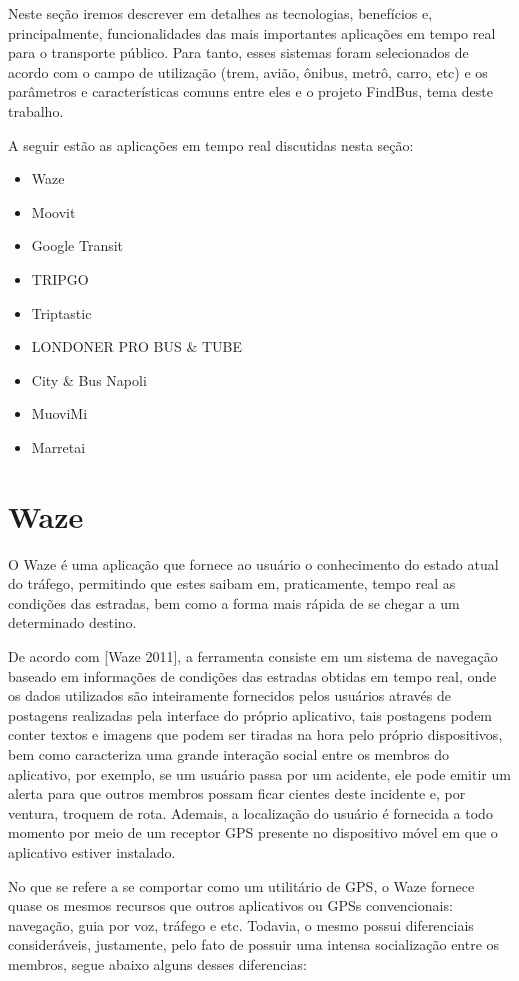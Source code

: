 Neste seção iremos descrever em detalhes as tecnologias, benefícios e, principalmente, funcionalidades das mais importantes aplicações em tempo real para o transporte público. Para tanto, esses sistemas foram selecionados de acordo com o campo de utilização (trem, avião, ônibus, metrô, carro, etc) e os parâmetros e características comuns entre eles e o projeto FindBus, tema deste trabalho. 

A seguir estão as aplicações em tempo real discutidas nesta seção:

\begin{itemize}

\item Waze
\item Moovit
\item Google Transit
\item TRIPGO
\item Triptastic
\item LONDONER PRO BUS \& TUBE
\item City \& Bus Napoli 
\item MuoviMi
\item Marretai
\end{itemize}

\section{Waze}

O Waze é uma aplicação que fornece ao usuário o conhecimento do estado atual do tráfego, permitindo que estes saibam em, praticamente, tempo real as condições das estradas, bem como a forma mais rápida de se chegar a um determinado destino. 

De acordo com [Waze 2011], a ferramenta consiste em um sistema de navegação baseado em informações de condições das estradas obtidas em tempo real, onde os dados utilizados são inteiramente fornecidos pelos usuários através de postagens realizadas pela interface do próprio aplicativo, tais postagens podem conter textos e imagens que podem ser tiradas na hora pelo próprio dispositivos, bem como caracteriza uma grande interação social entre os membros do aplicativo, por exemplo, se um usuário passa por um acidente, ele pode emitir um alerta para que outros membros possam ficar cientes deste incidente e, por ventura, troquem de rota. Ademais, a localização do usuário é fornecida a todo momento por meio de um receptor GPS presente no dispositivo móvel em que o aplicativo estiver instalado.   
 
No que se  refere a se comportar como um utilitário de GPS, o Waze fornece quase os mesmos recursos que outros aplicativos ou GPSs convencionais: navegação, guia por voz, tráfego e etc. Todavia, o mesmo possui diferenciais consideráveis, justamente, pelo fato de possuir uma intensa socialização entre os membros, segue abaixo alguns desses diferencias:

